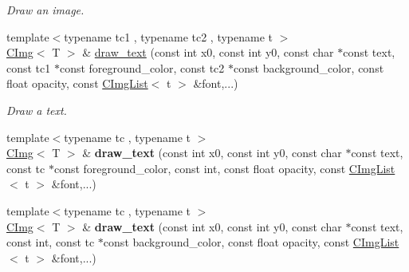 \begin{DoxyCompactItemize}
\begin{DoxyCompactList}\small\item\em Draw an image. \item\end{DoxyCompactList}\item 
{\footnotesize template$<$typename tc1 , typename tc2 , typename t $>$ }\\\hyperlink{structcimg__library_1_1CImg}{CImg}$<$ T $>$ \& \hyperlink{structcimg__library_1_1CImg_a10f19686ec4d22cf112d7d60a00849eb}{draw\_\-text} (const int x0, const int y0, const char $\ast$const text, const tc1 $\ast$const foreground\_\-color, const tc2 $\ast$const background\_\-color, const float opacity, const \hyperlink{structcimg__library_1_1CImgList}{CImgList}$<$ t $>$ \&font,...)
\begin{DoxyCompactList}\small\item\em Draw a text. \item\end{DoxyCompactList}\item 
\hypertarget{structcimg__library_1_1CImg_a21adab4f258adaf5e2125d368534b0c2}{
{\footnotesize template$<$typename tc , typename t $>$ }\\\hyperlink{structcimg__library_1_1CImg}{CImg}$<$ T $>$ \& {\bfseries draw\_\-text} (const int x0, const int y0, const char $\ast$const text, const tc $\ast$const foreground\_\-color, const int, const float opacity, const \hyperlink{structcimg__library_1_1CImgList}{CImgList}$<$ t $>$ \&font,...)}
\label{structcimg__library_1_1CImg_a21adab4f258adaf5e2125d368534b0c2}

\item 
\hypertarget{structcimg__library_1_1CImg_aa5c20030a345e6a6334f533f08ed02ff}{
{\footnotesize template$<$typename tc , typename t $>$ }\\\hyperlink{structcimg__library_1_1CImg}{CImg}$<$ T $>$ \& {\bfseries draw\_\-text} (const int x0, const int y0, const char $\ast$const text, const int, const tc $\ast$const background\_\-color, const float opacity, const \hyperlink{structcimg__library_1_1CImgList}{CImgList}$<$ t $>$ \&font,...)}
\label{structcimg__library_1_1CImg_aa5c20030a345e6a6334f533f08ed02ff}


\end{DoxyCompactItemize}
